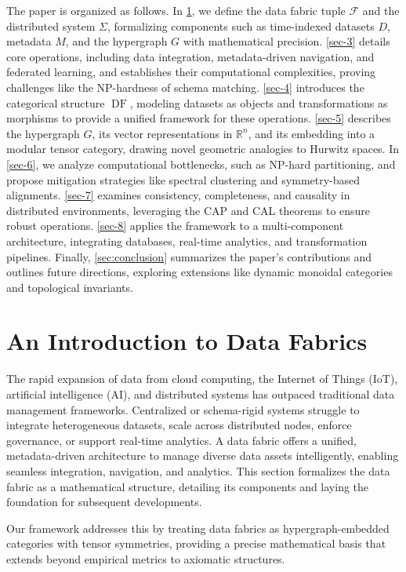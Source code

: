 \documentclass{amsart}
\newcommand\R{\mathbb R}
\newcommand\cF{\mathcal{F}}
\DeclareMathOperator\DF{DF}
\begin{document}
The paper is organized as follows. In \cref{sec-2}, we define the data fabric tuple \( \cF \) and the distributed system \( \Sigma \), formalizing components such as time-indexed datasets \( D \), metadata \( M \), and the hypergraph \( G \) with mathematical precision. \cref{sec-3} details core operations, including data integration, metadata-driven navigation, and federated learning, and establishes their computational complexities, proving challenges like the NP-hardness of schema matching. \cref{sec-4} introduces the categorical structure \( \DF \), modeling datasets as objects and transformations as morphisms to provide a unified framework for these operations. \cref{sec-5} describes the hypergraph \( G \), its vector representations in \( \R^{n} \), and its embedding into a modular tensor category, drawing novel geometric analogies to Hurwitz spaces. In \cref{sec-6}, we analyze computational bottlenecks, such as NP-hard partitioning, and propose mitigation strategies like spectral clustering and symmetry-based alignments. \cref{sec-7} examines consistency, completeness, and causality in distributed environments, leveraging the CAP and CAL theorems to ensure robust operations. \cref{sec-8} applies the framework to a multi-component architecture, integrating databases, real-time analytics, and transformation pipelines. Finally, \cref{sec:conclusion} summarizes the paper’s contributions and outlines future directions, exploring extensions like dynamic monoidal categories and topological invariants.



 
\section{An Introduction to Data Fabrics} \label{sec-2}
The rapid expansion of data from cloud computing, the Internet of Things (IoT), artificial intelligence (AI), and distributed systems has outpaced traditional data management frameworks. Centralized or schema-rigid systems struggle to integrate heterogeneous datasets, scale across distributed nodes, enforce governance, or support real-time analytics. A data fabric offers a unified, metadata-driven architecture to manage diverse data assets intelligently, enabling seamless integration, navigation, and analytics. This section formalizes the data fabric as a mathematical structure, detailing its components and laying the foundation for subsequent developments.

Our framework addresses this by treating data fabrics as hypergraph-embedded categories with tensor symmetries, providing a precise mathematical basis that extends beyond empirical metrics to axiomatic structures.
\end{document}
